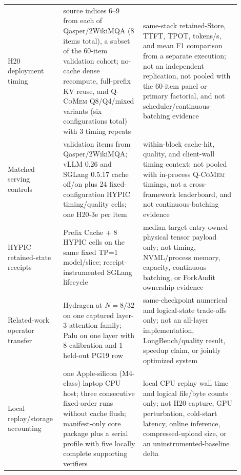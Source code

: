 \documentclass{article}
\newcommand{\qcomem}{\textsc{Q-CoMem}}
\begin{document}
\begin{longtable}{@{}>{\raggedright\arraybackslash}p{0.19\linewidth}>{\raggedright\arraybackslash}p{0.32\linewidth}>{\raggedright\arraybackslash}p{0.39\linewidth}@{}}
  H20 deployment timing & source indices 6--9 from each of Qasper/2WikiMQA (8 items total), a subset of the 60-item validation cohort; no-cache dense recompute, full-prefix KV reuse, and \qcomem{} Q8/Q4/mixed variants (six configurations total) with 3 timing repeats & same-stack retained-Store, TTFT, TPOT, tokens/s, and mean F1 comparison from a separate execution; not an independent replication, not pooled with the 60-item panel or primary factorial, and not scheduler/continuous-batching evidence \\
  Matched serving controls & 8 validation items from Qasper/2WikiMQA; vLLM 0.26 and SGLang 0.5.17 cache off/on plus 24 fixed-configuration HYPIC timing/quality cells; one H20-3e per item & within-block cache-hit, quality, and client-wall timing context; not pooled with in-process \qcomem{} timings, not a cross-framework leaderboard, and not continuous-batching evidence \\
  HYPIC retained-state receipts & 8 Prefix Cache + 8 HYPIC cells on the same fixed TP=1 model/slice; receipt-instrumented SGLang lifecycle & median target-entry-owned physical tensor payload only; not timing, NVML/process memory, capacity, continuous batching, or ForkAudit ownership evidence \\
  Related-work operator transfer & Hydragen at $N=8/32$ on one captured layer-3 attention family; Palu on one layer with 8 calibration and 1 held-out PG19 row & same-checkpoint numerical and logical-state trade-offs only; not an all-layer implementation, LongBench/quality result, speedup claim, or jointly optimized system \\
  Local replay/storage accounting & one Apple-silicon (M4-class) laptop CPU host; three consecutive fixed-order runs without cache flush; manifest-only core package plus a serial profile with five locally complete supporting verifiers & local CPU replay wall time and logical file/byte counts only; not H20 capture, GPU perturbation, cold-start latency, online inference, compressed-upload size, or an uninstrumented-baseline delta \\
\end{longtable}
\endgroup


\end{document}
